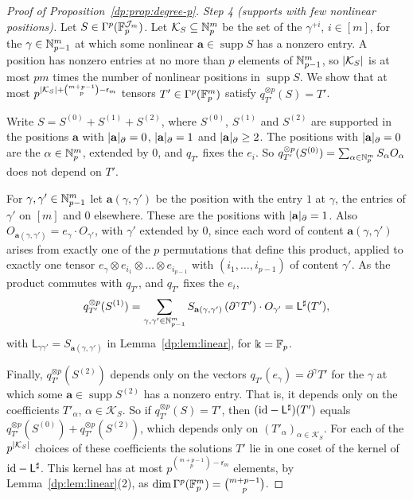 \begin{proof}[Proof of Proposition~\ref{dp:prop:degree-p}]
\emph{Step 4 (supports with few nonlinear positions).} Let $S\in\Gamma^p(\mathbb F_p^{\mathcal J_m})$. Let $\mathcal K_S\subseteq\mathbb N^m_p$ be the set of the $\gamma^{+i}$, $i\in[m]$, for the $\gamma\in\mathbb N^m_{p-1}$ at which some nonlinear $\mathbf a\in\operatorname{supp}S$ has a nonzero entry. A position has nonzero entries at no more than $p$ elements of $\mathbb N^m_{p-1}$, so $\lvert \mathcal K_S\rvert$ is at most $pm$ times the number of nonlinear positions in $\operatorname{supp}S$. We show that at most $p^{\lvert \mathcal K_S\rvert+\binom{m+p-1}p-\mathsf r_m}$ tensors $T'\in\Gamma^p(\mathbb F_p^m)$ satisfy $q_{T'}^{\otimes p}(S)=T'$.

Write $S=S^{(0)}+S^{(1)}+S^{(2)}$, where $S^{(0)}$, $S^{(1)}$ and $S^{(2)}$ are supported in the positions $\mathbf a$ with $\lvert \mathbf a\rvert_\partial=0$, $\lvert \mathbf a\rvert_\partial=1$ and $\lvert \mathbf a\rvert_\partial\ge2$. The positions with $\lvert \mathbf a\rvert_\partial=0$ are the $\alpha\in\mathbb N^m_p$, extended by $0$, and $q_{T'}$ fixes the $e_i$. So $q_{T'}^{\otimes p}(S^{(0)})=\sum_{\alpha\in\mathbb N^m_p}S_\alpha O_\alpha$ does not depend on $T'$.

For $\gamma,\gamma'\in\mathbb N^m_{p-1}$ let $\mathbf a(\gamma,\gamma')$ be the position with the entry $1$ at $\gamma$, the entries of $\gamma'$ on $[m]$ and $0$ elsewhere. These are the positions with $\lvert \mathbf a\rvert_\partial=1$. Also $O_{\mathbf a(\gamma,\gamma')}=e_\gamma\cdot O_{\gamma'}$, with $\gamma'$ extended by $0$, since each word of content $\mathbf a(\gamma,\gamma')$ arises from exactly one of the $p$ permutations that define this product, applied to exactly one tensor $e_\gamma\otimes e_{i_1}\otimes\dots\otimes e_{i_{p-1}}$ with $(i_1,\dots,i_{p-1})$ of content $\gamma'$. As the product commutes with $q_{T'}$, and $q_{T'}$ fixes the $e_i$,
\[
 q_{T'}^{\otimes p}(S^{(1)})=\sum_{\gamma,\gamma'\in\mathbb N^m_{p-1}}S_{\mathbf a(\gamma,\gamma')}\,(\partial^\gamma T')\cdot O_{\gamma'}=\mathsf L^\sharp(T'),
\]
with $\mathsf L_{\gamma\gamma'}=S_{\mathbf a(\gamma,\gamma')}$ in Lemma~\ref{dp:lem:linear}, for $\Bbbk=\mathbb F_p$.

Finally, $q_{T'}^{\otimes p}(S^{(2)})$ depends only on the vectors $q_{T'}(e_\gamma)=\partial^\gamma T'$ for the $\gamma$ at which some $\mathbf a\in\operatorname{supp}S^{(2)}$ has a nonzero entry. That is, it depends only on the coefficients $T'_\alpha$, $\alpha\in\mathcal K_S$. So if $q_{T'}^{\otimes p}(S)=T'$, then $(\mathrm{id}-\mathsf L^\sharp)(T')$ equals $q_{T'}^{\otimes p}(S^{(0)})+q_{T'}^{\otimes p}(S^{(2)})$, which depends only on $(T'_\alpha)_{\alpha\in\mathcal K_S}$. For each of the $p^{\lvert \mathcal K_S\rvert}$ choices of these coefficients the solutions $T'$ lie in one coset of the kernel of $\mathrm{id}-\mathsf L^\sharp$. This kernel has at most $p^{\binom{m+p-1}p-\mathsf r_m}$ elements, by Lemma~\ref{dp:lem:linear}(2), as $\dim\Gamma^p(\mathbb F_p^m)=\binom{m+p-1}p$.


\end{proof}
